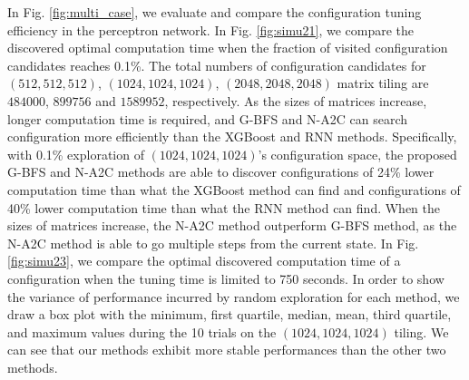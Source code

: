 In Fig. \ref{fig:multi_case}, we evaluate and compare the configuration tuning efficiency in the perceptron network. In Fig. \ref{fig:simu21}, we compare the discovered optimal computation time when the fraction of visited configuration candidates reaches 0.1\%. The total numbers of configuration candidates for $(512, 512, 512)$, $(1024, 1024, 1024)$, $(2048, 2048, 2048)$ matrix tiling are $484000$, $899756$ and $1589952$, respectively. As the sizes of matrices increase, longer computation time is required, and G-BFS and N-A2C can search configuration more efficiently than the XGBoost and RNN methods. Specifically, with 0.1\% exploration of $(1024, 1024, 1024)$'s configuration space, the proposed G-BFS and N-A2C methods are able to discover configurations of 24\% lower computation time than what the XGBoost method can find and configurations of 40\% lower computation time than what the RNN method can find. When the sizes of matrices increase, the N-A2C method outperform G-BFS method, as the N-A2C method is able to go multiple steps from the current state. In Fig. \ref{fig:simu23}, we compare the optimal discovered computation time of a configuration when the tuning time is limited to 750 seconds. In order to show the variance of performance incurred by random exploration for each method, we draw a box plot with the minimum, first quartile, median, mean, third quartile, and maximum values during the 10 trials on the $(1024, 1024, 1024)$ tiling. We can see that our methods exhibit more stable performances than the other two methods.


